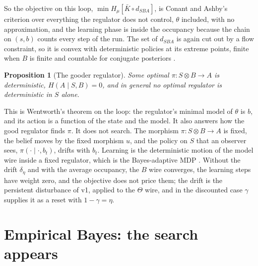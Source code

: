 \documentclass[10pt]{article}
\theoremstyle{plain}
\newtheorem{proposition}{Proposition}
\newcommand{\Hmu}[1]{H_\mu\!\left[#1\right]}
\newcommand{\Kb}{\bar K}
\begin{document}
So the objective on this loop, $\min \Hmu{\Kb \circ d_{SBA}}$, is Conant and Ashby's criterion over everything the regulator does not control, $\theta$ included, with no approximation, and the learning phase is inside the occupancy because the chain on $(s,b)$ counts every step of the run.
The set of $d_{SBA}$ is again cut out by a flow constraint, so it is convex with deterministic policies at its extreme points, finite when $B$ is finite and countable for conjugate posteriors \citep{Altman-markov91}.

\begin{proposition}[The gooder regulator]
\label{prop:gooder}
Some optimal $\pi\colon S \otimes B \to A$ is deterministic, $H(A \mid S,B) = 0$, and in general no optimal regulator is deterministic in $S$ alone.
\end{proposition}

\noindent
This is Wentworth's theorem on the loop: the regulator's minimal model of $\theta$ is $b$, and its action is a function of the state and the model.
It also answers how the good regulator finds $\pi$.
It does not search.
The morphism $\pi\colon S \otimes B \to A$ is fixed, the belief moves by the fixed morphism $u$, and the policy on $S$ that an observer sees, $\pi(\cdot \mid \cdot, b_t)$, drifts with $b_t$.
Learning is the deterministic motion of the model wire inside a fixed regulator, which is the Bayes-adaptive MDP \citep{Duff-optimal02}.
Without the drift $\delta_\eta$ and with the average occupancy, the $B$ wire converges, the learning steps have weight zero, and the objective does not price them; the drift is the persistent disturbance of v1, applied to the $\Theta$ wire, and in the discounted case $\gamma$ supplies it as a reset with $1-\gamma = \eta$.

\section{Empirical Bayes: the search appears}
\label{sec:eb}
\end{document}
